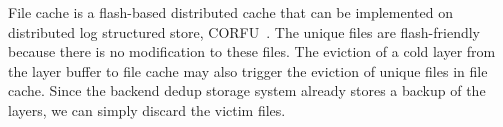 File cache is a flash-based distributed cache that can be implemented on 
distributed log structured store, \eg CORFU~\cite{180277}.
The unique files are flash-friendly because there is no modification to these files.
%
%
The eviction of a cold layer from the layer buffer to file cache
 may also trigger the eviction of unique files in file cache.
Since the backend dedup storage system already stores a backup of the layers, 
we can simply discard the victim files.

%
%
%

